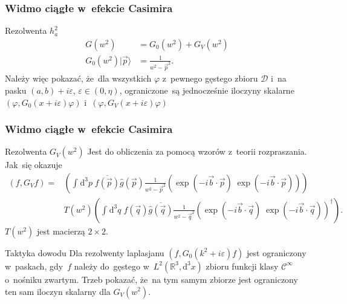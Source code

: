 \documentclass{beamer} \mode<presentation>
\newcommand{\fr}{\frac}
\newcommand{\ol}{\overline}
\newcommand{\wh}{\widehat}
\newcommand{\mr}{\mathrm}
\newcommand{\mb}{\mathbb}
\newcommand{\mc}{\mathcal}
\newcommand{\veps}{\varepsilon}
\newcommand{\vp}{\varphi}
\newcommand{\R}{\mb{R}}
\newcommand{\D}{\mc{D}}
\newcommand{\Cc}{\mc{C}}
\newcommand{\ti}{\times}
\newcommand{\de}{\mr{d}}
\newcommand{\IntWie}[3]{ \int_{ #1 } \de^{ #2 }#3 \; } %
\newcommand{\Cinfty}{\Cc^{ \infty }}
\newcommand{\da}{\dagger}
\newcommand{\rket}{\rangle}
\newcommand{\vecb}{\vec{ b }}
\newcommand{\vecp}{\vec{ p }}
\newcommand{\vecq}{\vec{ q }}
\newcommand{\g}{\wh{ g }}
\begin{document}
\begin{frame}
  \frametitle{Widmo ciągłe w~efekcie Casimira}

  \begin{block}{Rezolwenta $h_{ a }^{ 2 }$}
    \begin{align}
      \label{eq:18}
      G( w^{ 2 } ) &= G_{ 0 }( w^{ 2 } ) + G_{ V }( w^{ 2 } ) \\
      G_{ 0 }( w^{ 2 } ) | \vecp \rket &= \fr{ 1 }{ w^{ 2 } - \vecp^{ 2 } }.
    \end{align}
    Należy więc pokazać, że~dla wszystkich $\vp$ z~pewnego gęstego
    zbioru $\D$ i~na pasku $( a, b ) + i \veps$,
    $\veps \in ( 0, \eta )$, ograniczone~są jednocześnie iloczyny
    skalarne $( \vp, G_{ 0 }( x + i \veps ) \vp )$
    i~$( \vp, G_{ V }( x + i \veps ) \vp )$
  \end{block}

\end{frame}



\begin{frame}
  \frametitle{Widmo ciągłe w~efekcie Casimira}

  \begin{block}{Rezolwenta $G_{ V }( w^{ 2 } )$}
    Jest do obliczenia za pomocą wzorów z~teorii rozpraszania. Jak~się
    okazuje
    \begin{equation}
      \label{eq:20}
      \begin{split}
        ( f, G_{ V } f ) = &\left( \IntWie{}{ 3 }{ p } \ol{ f( \vecp )
          } \g( \vecp ) \fr{ 1 }{ w^{ 2 } - \vecp^{ 2 } } ( \exp( -i
          \vecb \cdot \vecp ) \; \exp( -i \vecb \cdot \vecp )
          ) \right) \\
        & T( w^{ 2 } ) \left( \IntWie{}{ 3 }{ q } f( \vecq ) \ol{ \g(
            \vecq ) } \fr{ 1 }{ w^{ 2 } - \vecq^{ 2 } } ( \exp( -i
          \vecb \cdot \vecq ) \; \exp( -i \vecb \cdot \vecq ) )^{ \da
          } \right).
      \end{split}
    \end{equation}
    $T( w^{ 2 } )$ jest macierzą $2 \ti 2$.
  \end{block}

  \begin{block}{Taktyka dowodu}
    Dla rezolwenty laplasjanu $( f, G_{ 0 }( k^{ 2 } + i \veps ) f)$
    jest ograniczony w~paskach, gdy~$f$ należy do~gęstego
    w~$L^{ 2 }( \R^{ 3 }, \de^{ 3 } x )$ zbioru funkcji klasy
    $\Cinfty$ o~nośniku zwartym. Trzeb pokazać, że~na tym samym
    zbiorze jest ograniczony ten sam iloczyn skalarny dla
    $G_{ V }( w^{ 2 } )$.
  \end{block}
  
\end{frame}
\end{document}
